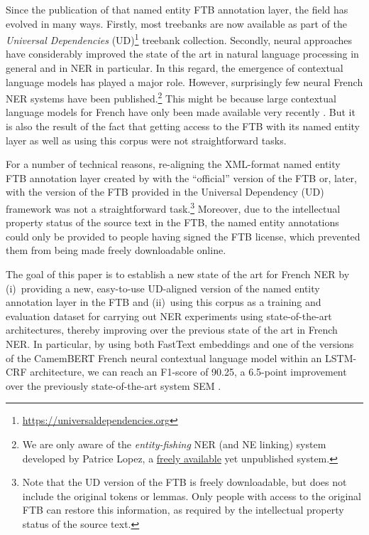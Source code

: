 Since the publication of that named entity FTB annotation layer, the field has evolved in many ways. Firstly, most treebanks are now available as part of the \emph{Universal Dependencies} (UD)\footnote{\url{https://universaldependencies.org}} treebank collection. Secondly, neural approaches have considerably improved the state of the art in natural language processing in general and in NER in particular. In this regard, the emergence of contextual language models has played a major role. However, surprisingly few neural French NER systems have been published.\footnote{We are only aware of the \emph{entity-fishing} NER (and NE linking) system developed by Patrice Lopez, a \href{https://github.com/kermitt2/entity-fishing}{freely available} yet unpublished system.} This might be because large contextual language models for French have only been made available very recently \cite{martin-etal-2020-camembert}. But it is also the result of the fact that getting access to the FTB with its named entity layer as well as using this corpus were not straightforward tasks.

For a number of technical reasons, re-aligning the XML-format named entity FTB annotation layer created by  with the ``official'' version of the FTB or, later, with the version of the FTB provided in the Universal Dependency (UD) framework was not a straightforward task.\footnote{Note that the UD version of the FTB is freely downloadable, but does not include the original tokens or lemmas. Only people with access to the original FTB can restore this information, as required by the  intellectual property status of the source text.} Moreover, due to the intellectual property status of the source text in the FTB, the named entity annotations could only be provided to people having signed the FTB license, which prevented them from being made freely downloadable online.

The goal of this paper is to establish a new state of the art for French NER by (i)~providing a new, easy-to-use UD-aligned version of the named entity annotation layer in the FTB and (ii)~using this corpus as a training and evaluation dataset for carrying out NER experiments using state-of-the-art architectures, thereby improving over the previous state of the art in French NER. In particular, by using both FastText embeddings \cite{bojanowski-etal-2017-enriching} and one of the versions of the CamemBERT French neural contextual language model \cite{martin-etal-2020-camembert} within an LSTM-CRF architecture, we can reach an F1-score of 90.25, a 6.5-point improvement over the previously state-of-the-art system SEM \cite{dupont-2017-exploration}.


